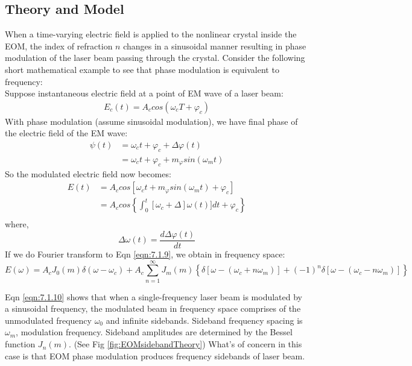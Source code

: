 \documentclass[12pt]{report}
\begin{document}
\subsection{Theory and Model}
When a time-varying electric field is applied to the nonlinear crystal inside the EOM, the index of refraction $n$ changes in a sinusoidal manner resulting in phase modulation of the laser beam passing through the crystal. Consider the following short mathematical example to see that phase modulation is equivalent to frequency: 
\\
Suppose instantaneous electric field at a point of EM wave of a laser beam: 
\begin{align*}
    E_c(t) = A_c cos(\omega_c T + \varphi_c)
\end{align*}
With phase modulation (assume sinusoidal modulation), we have final phase of the electric field of the EM wave: 
\begin{align*}
    \psi(t) &= \omega_c t + \varphi_c + \Delta \varphi (t) \\
            &= \omega_c t + \varphi_c + m_{\varphi} sin(\omega_m t)
\end{align*}
So the modulated electric field now becomes: 
\begin{align}
    E(t) &= A_c cos[ \omega_c t + m_{\varphi} sin(\omega_m t) + \varphi_c] \label{eqn:7.1.9}\\
         &= A_c cos\left\{  \int_0^t [ \omega_c + \Delta ]\omega(t)] dt + \varphi_c \right\} \\
\end{align}
where, 
\begin{equation*}
    \Delta \omega (t) = \frac{d\Delta \varphi (t)}{dt}
\end{equation*}
If we do Fourier transform to Eqn \ref{eqn:7.1.9}, we obtain in frequency space: 
\begin{equation}
    E(\omega) = A_c J_0(m) \delta(\omega - \omega_c) + A_c\sum_{n=1}^\infty J_m(m) \left\{ \delta[\omega-(\omega_c + n\omega_m)] +(-1)^n\delta[\omega-(\omega_c-n\omega_m)]\right\}
    \label{eqn:7.1.10}
\end{equation}

Eqn \ref{eqn:7.1.10} shows that when a single-frequency laser beam is modulated by a sinusoidal frequency, the modulated beam in frequency space comprises of the unmodulated frequency $\omega_0$ and infinite sidebands. Sideband frequency spacing is $\omega_m$, modulation frequency. 
Sideband amplitudes are determined by the Bessel function $J_n(m)$. (See Fig \ref{fig:EOMsidebandTheory}) What's of concern in this case is that EOM phase modulation produces frequency sidebands of laser beam. 
\end{document}
